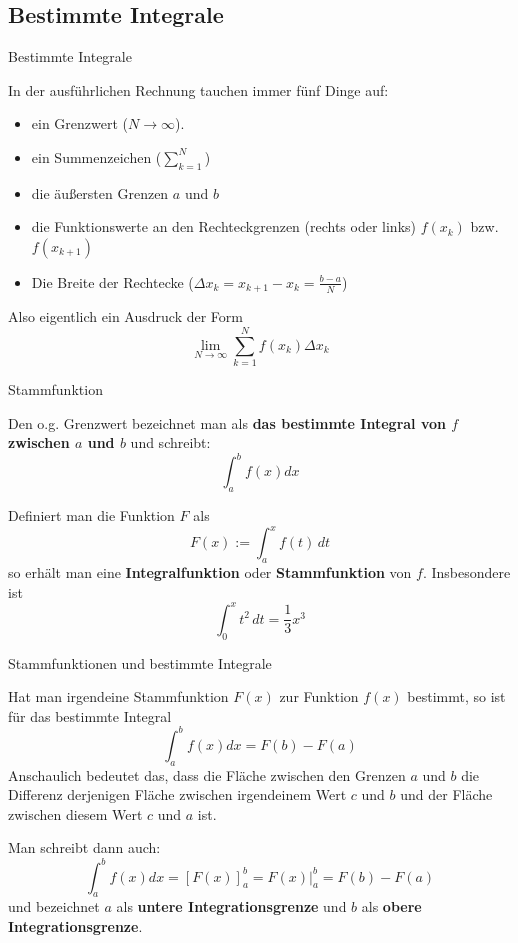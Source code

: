 \subsection{Bestimmte Integrale}
\begin{frame}{Bestimmte Integrale}
	
	\begin{bemerkung}
		In der ausführlichen Rechnung tauchen immer fünf Dinge auf:
		\begin{itemize}
			\item ein Grenzwert ($N \to \infty$).
			\item ein Summenzeichen ($\sum_{k=1}^{N}$)
			\item die äußersten Grenzen $a$ und $b$
			\item die Funktionswerte an den Rechteckgrenzen (rechts oder links) $f(x_{k})$ bzw. $f(x_{k+1})$
			\item Die Breite der Rechtecke ($\Delta x_{k} = x_{k+1} - x_{k} = \frac{b-a}{N}$)
		\end{itemize}
		Also eigentlich ein Ausdruck der Form
		\[
			\lim_{N \to \infty}\sum_{k=1}^{N} f(x_{k}) \Delta x_{k}
		\]
	\end{bemerkung}
\end{frame}	
\begin{frame}{Stammfunktion}
	\begin{definition}
		Den o.g. Grenzwert bezeichnet man als \textbf{das bestimmte Integral von $f$ zwischen $a$ und $b$} und schreibt:
		\[
			\int_{a}^{b} f(x) dx
		\]
	\end{definition}
	\begin{definition}
		Definiert man die Funktion $F$ als
		\[
			F(x):=\int_{a}^{x} f(t) \, dt
		\]
		so erhält man eine \textbf{Integralfunktion} oder \textbf{Stammfunktion} von $f$.
		Insbesondere ist 
		\[
			\int_{0}^{x} t^2 \, dt = \frac{1}{3} x^3
		\] 
	\end{definition}
\end{frame}

\begin{frame}{Stammfunktionen und bestimmte Integrale}
	\begin{bemerkung}
		Hat man irgendeine Stammfunktion $F(x)$ zur Funktion $f(x)$ bestimmt, so ist für das bestimmte Integral
		\[
			\int_{a}^{b} f(x) dx = F(b) - F(a)
		\]
		Anschaulich bedeutet das, dass die Fläche zwischen den Grenzen $a$ und $b$ die Differenz derjenigen Fläche zwischen irgendeinem Wert $c$ und $b$ und der Fläche zwischen diesem Wert $c$ und $a$ ist.
		
		Man schreibt dann auch:
		\[
		\int_{a}^{b} f(x) dx = [F(x)]_{a}^{b} = F(x) |_{a}^{b} = F(b) - F(a)	
		\] 
		und bezeichnet $a$ als \textbf{untere Integrationsgrenze} und $b$ als \textbf{obere Integrationsgrenze}.
	\end{bemerkung}
\end{frame}


